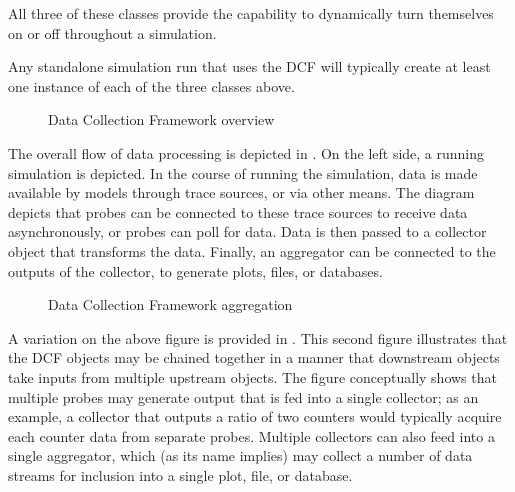 \documentclass[letterpaper,10pt,english]{sphinxmanual}
\begin{document}
All three of these classes provide the capability to dynamically turn themselves on or off throughout a simulation.

Any standalone  simulation run that uses the DCF will typically create
at least one instance of each of the three classes above.

\begin{figure}[htbp]
\centering
\capstart

\noindent{}
\caption{Data Collection Framework overview}\label{\detokenize{data-collection-overview:id1}}\label{\detokenize{data-collection-overview:dcf-overview}}\end{figure}

The overall flow of data processing is depicted in {\hyperref[\detokenize{data-collection-overview:dcf-overview}]{}}.  On
the left side, a running  simulation is depicted.  In the course
of running the simulation, data is made available by models through
trace sources, or via other means.  The diagram depicts that probes
can be connected to these trace sources to receive data asynchronously,
or probes can poll for data.  Data is then passed to a collector object
that transforms the data.  Finally, an aggregator can be connected
to the outputs of the collector, to generate plots, files, or databases.

\begin{figure}[htbp]
\centering
\capstart

\noindent{}
\caption{Data Collection Framework aggregation}\label{\detokenize{data-collection-overview:id2}}\label{\detokenize{data-collection-overview:dcf-overview-with-aggregation}}\end{figure}

A variation on the above figure is provided
in {\hyperref[\detokenize{data-collection-overview:dcf-overview-with-aggregation}]{}}.
This second figure illustrates that the DCF objects may be chained
together in a manner that downstream objects take inputs from multiple
upstream objects.  The figure conceptually shows that multiple probes
may generate output that is fed into a single collector; as an example,
a collector that outputs a ratio of two counters would typically acquire
each counter data from separate probes.  Multiple collectors can also
feed into a single aggregator, which (as its name implies) may collect
a number of data streams for inclusion into a single plot, file, or
database.
\end{document}
